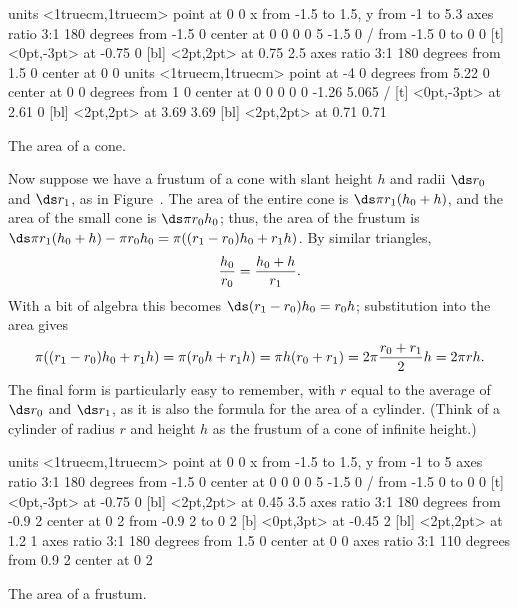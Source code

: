 \figure[H]
\centerline{\vbox{\beginpicture
\normalgraphs
\setcoordinatesystem units <1truecm,1truecm> point at 0 0
\setplotarea x from -1.5 to 1.5, y from -1 to 5.3
\ellipticalarc  axes ratio 3:1  180 degrees from -1.5 0 center at 0 0
 0 0 5 -1.5 0 /
\putrule from -1.5 0 to 0 0
 [t] <0pt,-3pt> at -0.75 0
 [bl] <2pt,2pt> at 0.75 2.5 
\setdashes
\ellipticalarc  axes ratio 3:1  180 degrees from 1.5 0 center at 0 0
\setsolid
\setcoordinatesystem units <1truecm,1truecm> point at -4 0
 degrees from 5.22 0 center at 0 0
 degrees from 1 0 center at 0 0
 0 0 0 -1.26 5.065 /
 [t] <0pt,-3pt> at 2.61 0
 [bl] <2pt,2pt> at 3.69 3.69  
 [bl] <2pt,2pt> at 0.71 0.71
\endpicture}}
\caption{\label{fig:area of cone}
The area of a cone.}
\endfigure

Now suppose we have a frustum of a cone with slant height $h$ and
radii $\ds r_0$ and $\ds r_1$, as in Figure~. The area of
the entire cone is $\ds \pi r_1(h_0+h)$, and the area of the small cone is
$\ds \pi r_0 h_0$; thus, the area of the frustum is $\ds \pi r_1(h_0+h)-\pi
r_0 h_0=\pi((r_1-r_0)h_0+r_1h)$. By similar triangles, 
$${h_0\over r_0}={h_0+h\over r_1}.$$
With a bit of algebra this becomes $\ds (r_1-r_0)h_0= r_0h$; substitution
into the area gives
$$
  \pi((r_1-r_0)h_0+r_1h)=\pi(r_0h+r_1h)=\pi h(r_0+r_1)=2\pi
  {r_0+r_1\over2} h = 2\pi r h.
$$
The final form is particularly easy to remember, with $r$ equal to the
average of $\ds r_0$ and $\ds r_1$, as it is also the formula for the area of
a cylinder. (Think of a cylinder of radius $r$ and height $h$ as the
frustum of a cone of infinite height.)

\figure[H]
\centerline{\vbox{\beginpicture
\normalgraphs
\setcoordinatesystem units <1truecm,1truecm> point at 0 0
\setplotarea x from -1.5 to 1.5, y from -1 to 5
\ellipticalarc  axes ratio 3:1  180 degrees from -1.5 0 center at 0 0
 0 0 5 -1.5 0 /
\putrule from -1.5 0 to 0 0
 [t] <0pt,-3pt> at -0.75 0
 [bl] <2pt,2pt> at 0.45 3.5 
\ellipticalarc  axes ratio 3:1  180 degrees from -0.9 2 center at 0 2
\putrule from -0.9 2 to 0 2
 [b] <0pt,3pt> at -0.45 2
 [bl] <2pt,2pt> at 1.2 1
\setdashes
\ellipticalarc  axes ratio 3:1  180 degrees from 1.5 0 center at 0 0
\ellipticalarc  axes ratio 3:1  110 degrees from 0.9 2 center at 0 2
\endpicture}}
\caption
{\label{fig:frustum}
The area of a frustum.}
\endfigure

